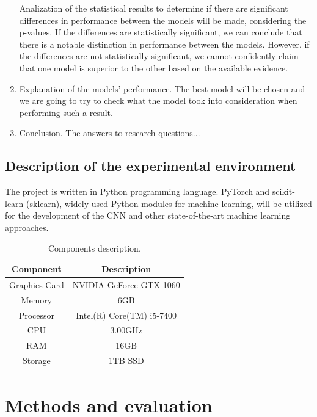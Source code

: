 \documentclass[runningheads]{llncs}
\begin{document}
\begin{enumerate}
  Analization of the statistical results to determine if there are significant differences in performance between the models will be made, considering the p-values. If the differences are statistically significant, we can conclude that there is a notable distinction in performance between the models. However, if the differences are not statistically significant, we cannot confidently claim that one model is superior to the other based on the available evidence.
  \item Explanation of the models' performance.
  \newline
  The best model will be chosen and we are going to try to check what the model took into consideration when performing such a result.
  \item Conclusion.
  \newline
  The answers to research questions...
\end{enumerate}

\subsection{Description of the experimental environment}
The project is written in Python programming language. PyTorch and scikit-learn (sklearn), widely used Python modules for machine learning, will be utilized for the development of the CNN and other state-of-the-art machine learning approaches.

\begin{table}[]
\caption{Components description.}
\centering
\begin{tabular}{|c|c|}
\hline
Component     & Description               \\ \hline
Graphics Card & NVIDIA GeForce GTX 1060   \\ \hline
Memory        & 6GB                       \\ \hline
Processor     & Intel(R) Core(TM) i5-7400 \\ \hline
CPU           & 3.00GHz                   \\ \hline
RAM           & 16GB                      \\ \hline
Storage       & 1TB SSD                   \\ \hline
\end{tabular}
\end{table}


\section{Methods and evaluation}
\end{document}
